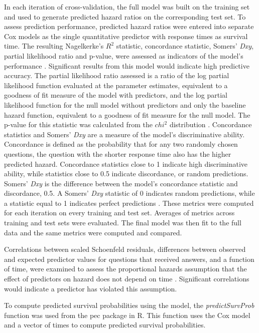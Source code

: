 \documentclass{article}
\begin{document}
In each iteration of cross-validation, the full model was built on the training set and used to generate predicted hazard ratios on the corresponding test set. To assess prediction performance, predicted hazard ratios were entered into separate Cox models as the single quantitative predictor with response times as survival time. The resulting Nagelkerke's $R^2$ statistic, concordance statistic, Somers' \textit{Dxy}, partial likelihood ratio and p-value, were assessed as indicators of the model's performance \cite{Chen}. Significant results from this model would indicate high predictive accuracy. The partial likelihood ratio assessed is a ratio of the log partial likelihood function evaluated at the parameter estimates, equivalent to a goodness of fit measure of the model with predictors, and the log partial likelihood function for the null model without predictors and only the baseline hazard function, equivalent to a goodness of fit measure for the null model. The p-value for this statistic was calculated from the $chi^2$ distribution \cite{Oakes1981}. Concordance statistics and Somers' \textit{Dxy} are a measure of the model's discriminative ability. Concordance is defined as the probability that for any two randomly chosen questions, the question with the shorter response time also has the higher predicted hazard. Concordance statistics close to 1 indicate high discriminative ability, while statistics close to 0.5 indicate discordance, or random predictions. Somers' \textit{Dxy} is the difference between the model's concordance statistic and discordance, 0.5. A Somers' \textit{Dxy} statistic of 0 indicates random predictions, while a statistic equal to 1 indicates perfect predictions \cite{Harrell2015}. These metrics were computed for each iteration on every training and test set. Averages of metrics across training and test sets were evaluated. The final model was then fit to the full data and the same metrics were computed and compared. 

Correlations between scaled Schoenfeld residuals, differences between observed and expected predictor values for questions that received answers, and a function of time, were examined to assess the proportional hazards assumption that the effect of predictors on hazard does not depend on time \cite{Grambsch1994}. Significant correlations would indicate a predictor has violated this assumption.

To compute predicted survival probabilities using the model, the \textit{predictSurvProb} function was used from the pec package in R. This function uses the Cox model and a vector of times to compute predicted survival probabilities. 
\end{document}
